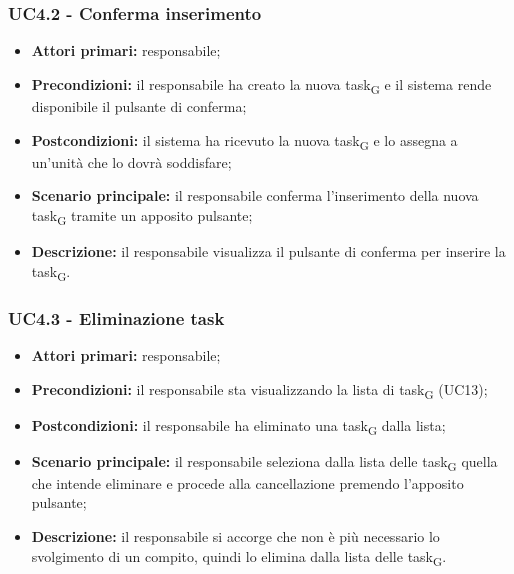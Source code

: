 \subsubsection{UC4.2 - Conferma inserimento}

\begin{itemize}
	\item 	\textbf{Attori primari:} responsabile;
	\item 	\textbf{Precondizioni:} il responsabile ha creato la nuova task\textsubscript{G} e il sistema rende disponibile il pulsante di conferma;
	\item 	\textbf{Postcondizioni:} il sistema ha ricevuto la nuova task\textsubscript{G} e lo assegna a un'unità che lo dovrà soddisfare;
	\item 	\textbf{Scenario principale:} il responsabile conferma l'inserimento della nuova task\textsubscript{G} tramite un apposito pulsante;
	\item 	\textbf{Descrizione:} il responsabile visualizza il pulsante di conferma per inserire la task\textsubscript{G}.
\end{itemize}

\subsubsection{UC4.3 - Eliminazione task}

\begin{itemize}
	\item 	\textbf{Attori primari:} responsabile;
	\item 	\textbf{Precondizioni:} il responsabile sta visualizzando la lista di task\textsubscript{G} (UC13);
	\item 	\textbf{Postcondizioni:} il responsabile ha eliminato una task\textsubscript{G} dalla lista;
	\item 	\textbf{Scenario principale:} il responsabile seleziona dalla lista delle task\textsubscript{G} quella che intende eliminare e procede alla cancellazione premendo l'apposito pulsante;
	\item 	\textbf{Descrizione:} il responsabile si accorge che non è più necessario lo svolgimento di un compito, quindi lo elimina dalla lista delle task\textsubscript{G}.

\end{itemize}

